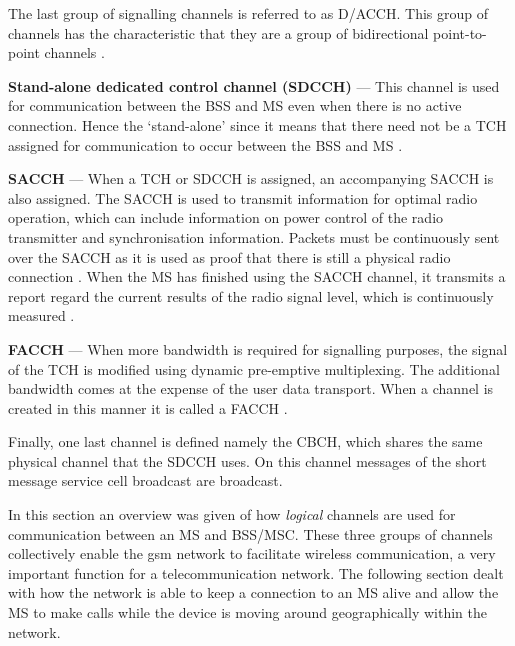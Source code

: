 The last group of signalling channels is referred to as \gls{D/ACCH}. This group of channels has the characteristic that they are a group of bidirectional point-to-point channels \cite{GSMArchitectureProtocolsServices}.
\begin{description}
  \item{\textbf{Stand-alone dedicated control channel (\gls{SDCCH})}} --- This channel is used for communication between the \gls{BSS} and \gls{MS} even when there is no active connection\cite{GSMArchitectureProtocolsServices}. Hence the `stand-alone' since it means that there need not be a \gls{TCH} assigned for communication to occur between the \gls{BSS} and \gls{MS} \cite{GSMArchitectureProtocolsServices}.
  \item{\textbf{\Gls{SACCH}}} --- When a \gls{TCH} or \gls{SDCCH} is assigned, an accompanying \gls{SACCH} is also assigned. The \gls{SACCH} is used to transmit information for optimal radio operation, which can include information on power control of the radio transmitter and synchronisation information\cite{GSMArchitectureProtocolsServices}. Packets must be continuously sent over the \gls{SACCH} as it is used as proof that there is still a physical radio connection \cite{GSMArchitectureProtocolsServices}. When the \gls{MS} has finished using the \gls{SACCH} channel, it transmits a report regard the current results of the radio signal level, which is continuously measured \cite{GSMArchitectureProtocolsServices}.
  \item{\textbf{\Gls{FACCH}}} --- When more bandwidth is required for signalling purposes, the signal of the \gls{TCH} is modified using dynamic pre-emptive multiplexing. The additional bandwidth comes at the expense of the user data transport\cite{GSMArchitectureProtocolsServices}. When a channel is created in this manner it is called a \gls{FACCH} \cite{GSMArchitectureProtocolsServices}.
\end{description}

Finally, one last channel is defined namely the \gls{CBCH}, which shares the same physical channel that the \gls{SDCCH} uses. On this channel messages of the short message service cell broadcast are broadcast\cite{GSMArchitectureProtocolsServices}.

In this section an overview was given of how \emph{logical} channels are used for communication between an \gls{MS}  and \gls{BSS}/\gls{MSC}\@. These three groups of channels collectively enable the \gls{gsm} network to facilitate wireless communication, a very important function for a telecommunication network. The following section dealt with how the network is able to keep a connection to an \gls{MS} alive and allow the \gls{MS} to make calls while the device is moving around geographically within the network.
